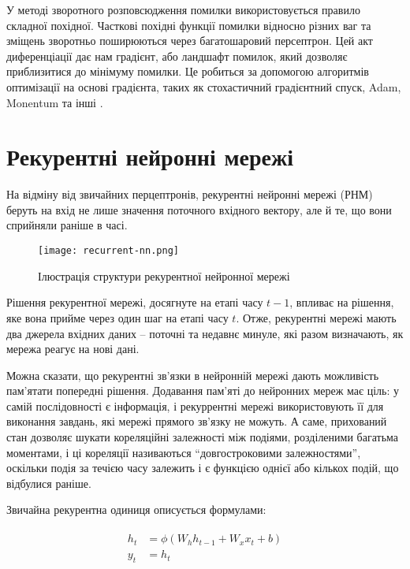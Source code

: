 У методі зворотного розповсюдження помилки
використовується правило складної похідної.
Часткові похідні функції помилки відносно різних ваг та зміщень
зворотньо поширюються через багатошаровий персептрон.
Цей акт диференціації дає нам градієнт, або ландшафт помилок,
який дозволяє приблизитися до мінімуму помилки. Це робиться
за допомогою алгоритмів оптимізації на основі градієнта, таких
як стохастичний градієнтний спуск, Adam, Monentum та інші
\cite{gradient-descend}.


\section{Рекурентні нейронні мережі}

На відміну від звичайних перцептронів, рекурентні нейронні
мережі (РНМ)
беруть на вхід не лише значення поточного вхідного вектору,
але й те, що вони сприйняли раніше в часі.

\begin{figure}[H]
    \centering
    \texttt{[image: recurrent-nn.png]}
    \caption{Ілюстрація структури рекурентної нейронної мережі}
    \label{fig:rnn}
\end{figure}

Рішення рекурентної мережі, досягнуте на етапі часу $t-1$, впливає
на рішення, яке вона прийме через один шаг на етапі часу $t$.
Отже, рекурентні мережі мають два джерела вхідних даних -- поточні
та недавнє минуле, які разом визначають, як мережа
реагує на нові дані.

Можна сказати, що рекурентні зв'язки в нейронній мережі
дають можливість пам'ятати попередні рішення.
Додавання пам’яті до нейронних мереж має ціль: у самій послідовності
є інформація, і рекуррентні мережі використовують її для виконання
завдань, які мережі прямого зв'язку не можуть.
А саме, прихований стан дозволяє шукати
кореляційні залежності між подіями, розділеними багатьма моментами,
і ці кореляції називаються ``довгостроковими залежностями'',
оскільки подія за течією часу залежить і є функцією однієї
або кількох подій, що відбулися раніше.

Звичайна рекурентна одиниця описується формулами:

\vspace{0.5em}
\begin{gather}
\begin{aligned}
    h_t &= \phi(W_h h_{t-1}+W_x x_t+b)\\
    y_t &= h_t
\end{aligned}
\end{gather}
\vspace{\baselineskip}

